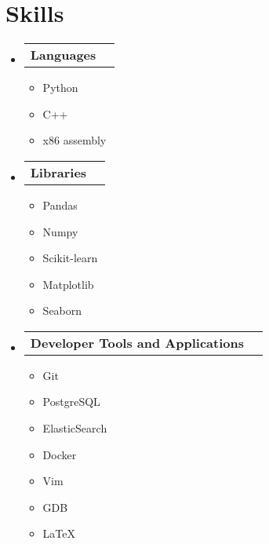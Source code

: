 \documentclass[letterpaper,11pt]{article}
\makeatletter
\newcommand{\resumeItem}[1]{
  \item\small{
    {#1 \vspace{-2pt}}
  }
}
\newcommand{\resumeProjectHeading}[2]{
    \item
    \begin{tabular*}{0.97\textwidth}{l@{\extracolsep{\fill}}r}
      \small#1 & #2 \\
    \end{tabular*}\vspace{-7pt}
}
\newcommand{\resumeSubHeadingListStart}{\begin{itemize}[leftmargin=0.15in, label={}]}
\newcommand{\resumeSubHeadingListEnd}{\end{itemize}}
\newcommand{\resumeItemListStart}{\begin{itemize}}
\newcommand{\resumeItemListEnd}{\end{itemize}\vspace{-5pt}}
\makeatother
\begin{document}
\section{Skills}
  \resumeSubHeadingListStart

    \resumeProjectHeading
      {\textbf{Languages}}{}
      \resumeItemListStart
 \resumeItem{Python}
        \resumeItem{C++}
  
        \resumeItem{x86 assembly}
      \resumeItemListEnd

    \resumeProjectHeading
      {\textbf{Libraries}}{}
      {}{}
      \resumeItemListStart
        \resumeItem{Pandas}
        \resumeItem{Numpy}
		\resumeItem{Scikit-learn}
        \resumeItem{Matplotlib}
        \resumeItem{Seaborn}
     
      \resumeItemListEnd
      
    \resumeProjectHeading
      {\textbf{Developer Tools and Applications}}{}
      {}{}
      \resumeItemListStart
		\resumeItem{Git}
		\resumeItem{PostgreSQL}
		\resumeItem{ElasticSearch}
		\resumeItem{Docker}
        \resumeItem{Vim}
		\resumeItem{GDB}
        \resumeItem{LaTeX}
      \resumeItemListEnd
     
    \resumeSubHeadingListEnd

\end{document}
